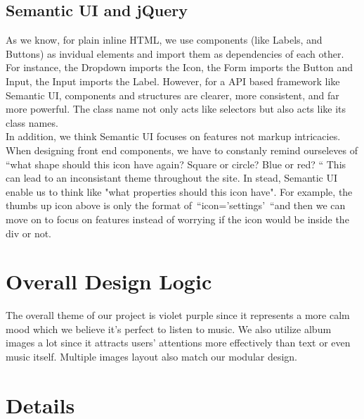 \documentclass[letterpaper, 12pt]{report}
\begin{document}
	\subsection{Semantic UI and jQuery}
	As we know, for plain inline HTML, we use components (like Labels, and Buttons) as invidual elements and import them as dependencies of each other. For instance, the Dropdown imports the Icon, the Form imports the Button and Input, the Input imports the Label. However, for a API based framework like Semantic UI, components and structures are clearer, more consistent, and far more powerful. The class name not only acts like selectors but also acts like its class names.\\
	In addition, we think Semantic UI focuses on features not markup intricacies. 
	When designing front end components, we have to constanly remind ourseleves of “what shape should this icon have again? Square or circle? Blue or red? “ This can lead to an inconsistant theme throughout the site. In stead, Semantic UI enable us to think like "what properties should this icon have". For example, the thumbs up icon above is only the format of “icon='settings' “and then we can move on to focus on features instead of worrying if the icon would be inside the div or not. 
	
	
	
	\section{Overall Design Logic}
	The overall theme of our project is violet purple since it represents a more calm mood which we believe it’s perfect to listen to music. We also utilize album images a lot since it attracts users’ attentions more effectively than text or even music itself. Multiple images layout also match our modular design. 
	
	
	\section{Details}
\end{document}
